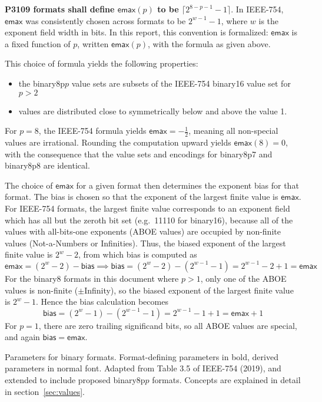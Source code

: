 \documentclass{article}
\def\parameter#1{\ensuremath{\mathsf{#1}}\xspace}
\def\emax{\parameter{emax}}
\def\bias{\parameter{bias}}
\newcommand{\spec}[1]{{\bf #1}}
\begin{document}
\spec{\boldmath P3109 formats shall define $\emax(p)$ to be $\lceil 2^{8-p-1}-1 \rceil$}.
In IEEE-754, \emax was consistently chosen across formats to be $2^{w-1}-1$, where $w$ is the exponent field width in bits.
In this report, this convention is formalized: $\emax$ is a fixed function of $p$, written $\emax(p)$, with the formula as given above.

This choice of formula yields the following properties:
\begin{itemize}
\item the binary8p$p$ value sets are subsets of the IEEE-754 binary16 value set for $p>2$
\item values are distributed close to symmetrically below and above the value 1.
\end{itemize}
{For $p=8$, the IEEE-754 formula yields $\emax = -\frac12$, meaning all non-special values are irrational.  Rounding the computation upward yields $\emax(8)=0$, with the consequence that the value sets and encodings for binary8p7 and binary8p8 are identical.}

The choice of \emax for a given format then determines the exponent bias for that format.  The bias is chosen so that the exponent of the largest finite value is \emax.
For IEEE-754 formats, the largest finite value corresponds to an exponent field which has all but the zeroth bit set (e.g.\ 11110 for binary16), because all of the values with all-bits-one exponents (ABOE values) are occupied by non-finite values (Not-a-Numbers or Infinities).
Thus, the biased exponent of the largest finite value is $2^w-2$, from which bias is computed as
$$
\emax = (2^w-2) - \bias \implies \bias = (2^w - 2) - (2^{w-1}-1) = 2^{w-1} - 2 + 1 = \emax
$$
For the binary8 formats in this document where $p>1$, only one of the ABOE values is non-finite ($\pm$Infinity), so the biased exponent of the largest finite value is $2^w - 1$.
Hence the bias calculation becomes
$$
\bias = (2^w - 1) - (2^{w-1}-1) = 2^{w-1} - 1 + 1 = \emax + 1
$$
For $p=1$, there are zero trailing significand bits, so all ABOE values are special, and again $\bias=\emax$. 

\begin{table}[tb]
\centering

\caption{Parameters for binary formats. Format-defining parameters in bold, derived parameters in normal font.
Adapted from Table 3.5 of IEEE-754 (2019), and extended to include proposed binary8p$p$ formats.  Concepts are explained in detail in section~\ref{sec:values}.
}
\label{tbl:parameters}
\end{table}
\end{document}
